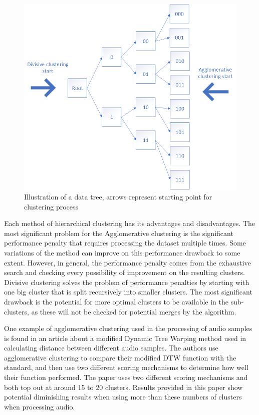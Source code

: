 \begin{figure}[htbp]  %
  \centering
  \includegraphics[width=.6\textwidth]{figures/clustering.png}
  \caption{Illustration of a data tree, arrows represent starting point for clustering process}
  \label{fig:clusterex}
\end{figure}

Each method of hierarchical clustering has its advantages and disadvantages. 
The most significant problem for the Agglomerative clustering is the significant performance penalty that requires processing the dataset multiple times. 
Some variations of the method can improve on this performance drawback to some extent. 
However, in general, the performance penalty comes from the exhaustive search and checking every possibility of improvement on the resulting clusters. 
Divisive clustering solves the problem of performance penalties by starting with one big cluster that is split recursively into smaller clusters. 
The most significant drawback is the potential for more optimal clusters to be available in the sub-clusters, as these will not be checked for potential merges by the algorithm.

One example of agglomerative clustering used in the processing of audio samples is found in an article about a modified Dynamic Tree Warping method used in calculating distance between different audio samples\cite{ClusterExample}. 
The authors use agglomerative clustering to compare their modified DTW function with the standard, and then use two different scoring mechanisms to determine how well their function performed. 
The paper uses two different scoring mechanisms and both top out at around 15 to 20 clusters.
Results provided in this paper show potential diminishing results when using more than these numbers of clusters when processing audio.

